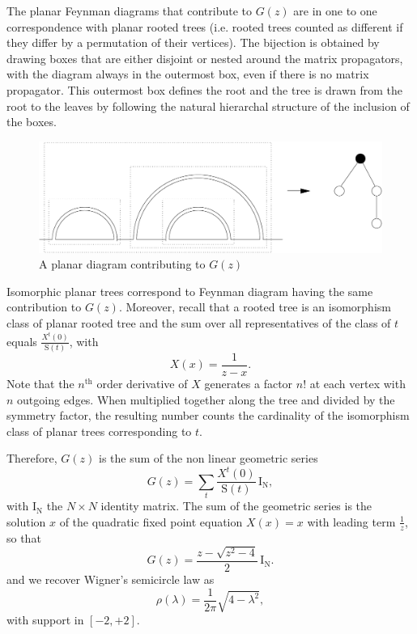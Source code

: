 \documentclass[12pt,here,feynmf]{article}
\begin{document}
The planar Feynman diagrams that contribute to $G(z)$ are in one to one correspondence with planar rooted trees (i.e. rooted trees counted as different if they differ by a permutation of their vertices).  The bijection is obtained by  drawing boxes that are either disjoint or nested around the matrix propagators, with the diagram always in the outermost box, even if there is no matrix propagator. This outermost box defines the root and the tree is drawn from the root to the leaves by following the natural hierarchal structure of the inclusion of the boxes.

\begin{figure}
\begin{center}
\includegraphics[width=15cm]{wigner.pdf}
\caption{A planar diagram contributing to $G(z)$}
\end{center}
\end{figure}

Isomorphic planar trees correspond to Feynman diagram having the same contribution to $G(z)$. Moreover, recall that a rooted tree is an isomorphism class of planar rooted tree and the sum over all representatives of the class of $t$ equals $\frac{X^{t}(0)}{\mathrm{S}(t)}$, with
\begin{equation}
X(x)=\frac{1}{z-x}.
\end{equation}
Note that the $n^{\mathrm{th}}$ order derivative of $X$ generates a factor $n!$ at each vertex with $n$ outgoing edges. When multiplied together along the tree and divided by the symmetry factor, the resulting number counts the cardinality of the isomorphism class of planar trees corresponding to $t$.

Therefore, $G(z)$ is the sum of the non linear geometric series
\begin{equation}
G(z)=\sum_{t}\frac{X^{t}(0)}{\mathrm{S}(t)}\,\mathrm{I_{N}},
\end{equation}
with $\mathrm{I_{N}}$ the $N\times N$ identity matrix. The sum of the geometric series is the solution $x$ of the quadratic fixed point equation $X(x)=x$ with leading term $\frac{1}{z}$, so that
\begin{equation}
G(z)=\frac{z-\sqrt{z^{2}-4}}{2}\,\mathrm{I_{N}}.
\end{equation}
and we recover Wigner's semicircle law as
\begin{equation}
\rho(\lambda)=\frac{1}{2\pi}\sqrt{4-\lambda^{2}},
\end{equation}
with support in $[-2,+2]$.
\end{document}
